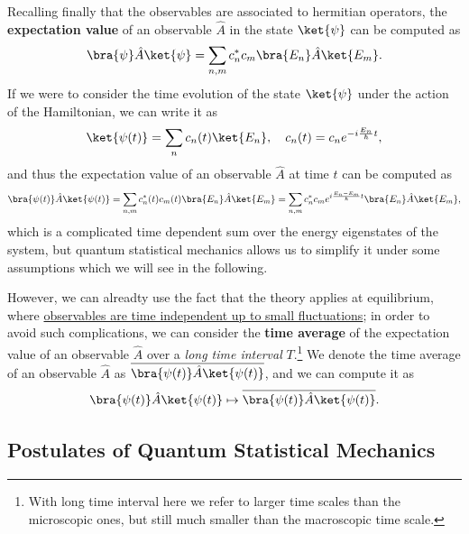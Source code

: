Recalling finally that the observables are associated to hermitian operators, the \textbf{expectation value} of an observable \(\hat{A}\) in the state \(\ket{\psi}\) can be computed as
\[
    \bra{\psi} \hat{A} \ket{\psi} = \sum_{n,m} c_n^* c_m \bra{E_n} \hat{A} \ket{E_m}.
\]
If we were to consider the time evolution of the state \(\ket{\psi}\) under the action of the Hamiltonian, we can write it as
\[
    \ket{\psi(t)} = \sum_{n} c_n(t) \ket{E_n}, \quad c_n(t) = c_n e^{-i \frac{E_n}{\hbar} t},
\]
and thus the expectation value of an observable \(\hat{A}\) at time \(t\) can be computed as
\[
    \bra{\psi(t)} \hat{A} \ket{\psi(t)} = \sum_{n,m} c_n^*(t) c_m(t) \bra{E_n} \hat{A} \ket{E_m} = \sum_{n,m} c_n^* c_m e^{i \frac{E_n - E_m}{\hbar} t} \bra{E_n} \hat{A} \ket{E_m},
\]
which is a complicated time dependent sum over the energy eigenstates of the system, but quantum statistical mechanics allows us to simplify it under some assumptions which we will see in the following.

However, we can alreadty use the fact that the theory applies at equilibrium, where \uline{observables are time independent up to small fluctuations}; in order to avoid such complications, we can consider the \textbf{time average} of the expectation value of an observable \(\hat{A}\) over a \textit{long time interval} \(T\).\footnote{With long time interval here we refer to larger time scales than the microscopic ones, but still much smaller than the macroscopic time scale.} We denote the time average of an observable \(\hat{A}\) as \(\overline{\bra{\psi(t)} \hat{A} \ket{\psi(t)}}\), and we can compute it as
\[
    \bra{\psi(t)} \hat{A} \ket{\psi(t)} \mapsto \overline{\bra{\psi(t)} \hat{A} \ket{\psi(t)}}.
\]

\subsection{Postulates of Quantum Statistical Mechanics}

